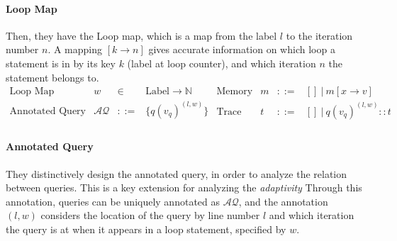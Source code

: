 \paragraph*{Loop Map}
Then, they have the Loop map, which is a map from the label $l$ to the iteration number $n$.
  A mapping $[k \to n]$ gives accurate information on which loop a statement is in by its key $k$ (label at loop counter),
  and which iteration $n$ the statement belongs to.
\[
\begin{array}{llll}
 \mbox{Loop Map} & w & \in & \mbox{Label} \to \mathbb{N} \\
\mbox{Annotated Query} & \mathcal{AQ}  & ::= & \{ q(v_q)^{(l,w)}  \} \\
\end{array}
\begin{array}{llll}
    \mbox{Memory} & m & ::= & [] ~|~ m[x \to v] \\
\mbox{Trace} & t & ::= & [] ~|~ q(v_q)^{(l, w) } :: t \\
\end{array}
\]

 \paragraph*{Annotated Query} 
 They 
distinctively design the annotated query, in order to analyze the relation between queries. This is a key extension for analyzing the \emph{adaptivity}
Through this annotation, queries can be uniquely annotated as $\mathcal{AQ}$,
  and the annotation $(l,w)$ considers the location of the query
  by line number $l$ and which iteration the query is at when it appears in a loop statement, specified by $w$.
